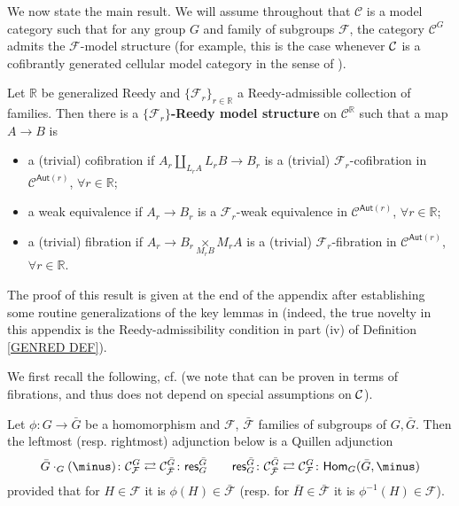 \documentclass[a4paper,10pt,draft]{article}%
\begin{document}
We now state the main result.
We will assume throughout that $\mathcal{C}$ is a model category such that for any group $G$ and family of subgroups $\mathcal{F}$,
the category $\mathcal{C}^G$ admits the
$\mathcal{F}$-model structure
(for example, this is the case whenever $\mathcal{C}$ is a cofibrantly generated cellular model category in the sense of \cite{Ste16}).


\begin{theorem}\label{REEDYADM THM}
Let $\mathbb{R}$ be generalized Reedy and 
$\{\mathcal{F}_r\}_{r \in \mathbb{R}}$ a Reedy-admissible collection of families. 
Then there is a \textbf{$\{\mathcal{F}_r\}$-Reedy model structure} on
$\mathcal{C}^{\mathbb{R}}$ such that a map $A \to B$ is
\begin{itemize}
  \item a (trivial) cofibration if $A_r \underset{L_r A}{\amalg}L_r B \to B_r$ is a (trivial) $\mathcal{F}_r$-cofibration in $\mathcal{C}^{\mathsf{Aut}(r)}$, $\forall r \in \mathbb{R}$;
	\item a weak equivalence if $A_r \to B_r$ is a $\mathcal{F}_r$-weak equivalence in $\mathcal{C}^{\mathsf{Aut}(r)}$, $\forall r \in \mathbb{R}$;
	\item a (trivial) fibration if $A_r \to B_r \underset{M_r B}{\times }M_r A $ is a (trivial) $\mathcal{F}_r$-fibration in $\mathcal{C}^{\mathsf{Aut}(r)}$, $\forall r \in \mathbb{R}$.
\end{itemize}
\end{theorem}

The proof of this result is given at the end of the appendix after establishing some routine generalizations of the key lemmas in \cite{BM11}
(indeed, the true novelty in this appendix is the Reedy-admissibility condition in part (iv) of Definition \ref{GENRED DEF}).

We first recall the following, cf. \cite[Props. 6.5 and 6.6]{BP17}
(we note that \cite[Prop. 6.6]{BP17} can be proven in terms of fibrations, and thus does not depend on special assumptions on $\mathcal{C}$).
\begin{proposition}
Let $\phi \colon G \to \bar{G}$ be a homomorphism and
$\mathcal{F}$, $\bar{\mathcal{F}}$ families of subgroups of
$G, \bar{G}$. Then the leftmost (resp. rightmost) adjunction below
is a Quillen adjunction 
\[
	\bar{G} \cdot_G (\minus)
	\colon \C^G_{\mathcal{F}}
		\rightleftarrows
	\C^{\bar{G}}_{\bar{\mathcal{F}}} \colon
	\mathsf{res}^{\bar{G}}_G
\qquad
	\mathsf{res}^{\bar{G}}_G
	\colon	\C^{\bar{G}}_{\bar{\mathcal{F}}}
		\rightleftarrows
	\C^G_{\mathcal{F}} \colon
	\mathsf{Hom}_G(\bar{G},\minus)
\]
provided that for $H \in \mathcal{F}$ it is
$\phi(H) \in \bar{\mathcal{F}}$
(resp. for $\bar{H} \in \bar{\mathcal{F}}$ it is
$\phi^{-1}(H) \in \mathcal{F}$).
\end{proposition}
\end{document}
